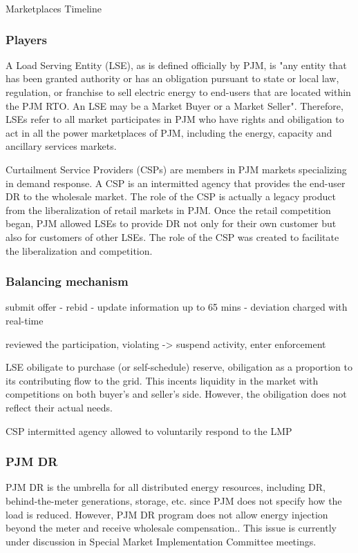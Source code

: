 Marketplaces
Timeline

\subsubsection{Players}
A Load Serving Entity (LSE), as is defined officially by PJM, is "any entity that has been granted authority or has an obligation pursuant to state or local law, regulation, or franchise to sell electric energy to end-users that are located within the PJM RTO. An LSE may be a Market Buyer or a Market Seller"\cite{PJM2017b}. Therefore, LSEs refer to all market participates in PJM who have rights and obiligation to act in all the power marketplaces of PJM, including the energy, capacity and ancillary services markets. 

Curtailment Service Providers (CSPs) are members in PJM markets specializing in demand response. A CSP is an intermitted agency that provides the end-user DR to the wholesale market. \cite{PJM2017b} \cite{Wang2015} The role of the CSP is actually a legacy product from the liberalization of retail markets in PJM. Once the retail competition began, PJM allowed LSEs to provide DR not only for their own customer but also for customers of other LSEs. The role of the CSP was created to facilitate the liberalization and competition. \cite{PJMInterconnection2017}

\subsubsection{Balancing mechanism}
submit offer - rebid - update information up to 65 mins - deviation charged with real-time

reviewed the participation, violating -> suspend activity, enter enforcement

LSE obiligate to purchase (or self-schedule) reserve, obiligation as a proportion to its contributing flow to the grid. \cite{PJM2017c} This incents liquidity in the market with competitions on both buyer's and seller's side. However, the obiligation does not reflect their actual needs.\cite{Wartsila2014}

CSP
intermitted agency
allowed to voluntarily respond to the LMP

\subsubsection{PJM DR}

PJM DR is the umbrella for all distributed energy resources, including DR, behind-the-meter generations, storage, etc. since PJM does not specify how the load is reduced. However, PJM DR program does not allow energy injection beyond the meter and receive wholesale compensation.\cite{PJMInterconnection2017}. This issue is currently under discussion in Special Market Implementation Committee meetings.

